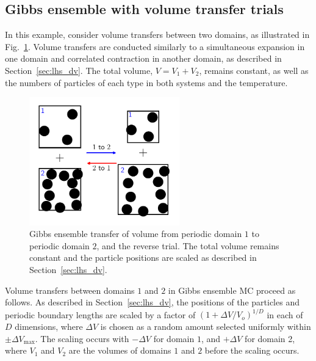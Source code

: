 \documentclass[
  9pt,
  bestpractices,
  pubversion,
]{livecoms}
\begin{document}
\begin{figure}

\end{figure}

\subsection{\label{sec:lhs_gibbs_volume}Gibbs ensemble with volume transfer trials}

In this example, consider volume transfers between two domains, as illustrated in Fig.~\ref{fig:gibbs_volume}.
Volume transfers are conducted similarly to a simultaneous expansion in one domain and correlated contraction in another domain, as described in Section~\ref{sec:lhs_dv}.
The total volume, $V=V_1+V_2$, remains constant, as well as the numbers of particles of each type in both systems and the temperature.

\begin{figure}
\begin{centering}
\includegraphics[width=6.5cm]{../figures/gibbs_volume.pdf}
\caption{
Gibbs ensemble transfer of volume from periodic domain $1$ to periodic domain $2$, and the reverse trial.
The total volume remains constant and the particle positions are scaled as described in Section~\ref{sec:lhs_dv}.
}
\label{fig:gibbs_volume}
\end{centering}
\end{figure}

Volume transfers between domains $1$ and $2$ in Gibbs ensemble MC proceed as follows.
As described in Section~\ref{sec:lhs_dv}, the positions of the particles and periodic boundary lengths are scaled by a factor of $(1+\Delta V/V_o)^{1/D}$ in each of $D$ dimensions, where $\Delta V$ is chosen as a random amount selected uniformly within $\pm\Delta V_{\mathrm{max}}$.
The scaling occurs with $-\Delta V$ for domain $1$, and $+\Delta V$ for domain 2, where $V_1$ and $V_2$ are the volumes of domains $1$ and $2$ before the scaling occurs.
\end{document}
